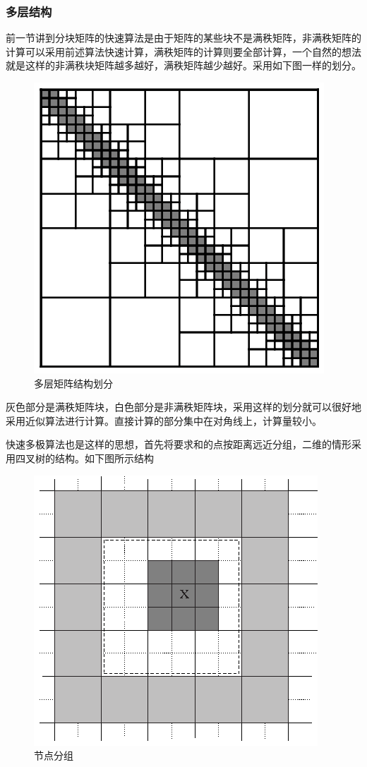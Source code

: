 \subsubsection{多层结构}
前一节讲到分块矩阵的快速算法是由于矩阵的某些块不是满秩矩阵，非满秩矩阵的计算可以采用前述算法快速计算，满秩矩阵的计算则要全部计算，一个自然的想法就是这样的非满秩块矩阵越多越好，满秩矩阵越少越好。采用如下图一样的划分。
\begin{figure}[htbp]
	\begin{center}
		\includegraphics{pics/adaptive_matrix.eps}
	\end{center}
	\caption{多层矩阵结构划分}
	\label{fig:muli_matrix}
\end{figure}

灰色部分是满秩矩阵块，白色部分是非满秩矩阵块，采用这样的划分就可以很好地采用近似算法进行计算。直接计算的部分集中在对角线上，计算量较小。

快速多极算法也是这样的思想，首先将要求和的点按距离远近分组，二维的情形采用四叉树的结构。如下图所示结构

\begin{figure}[htbp]
	\begin{center}
		\includegraphics{pics/cluster.eps}
	\end{center}
	\caption{节点分组}
	\label{fig:cluster}
\end{figure}

